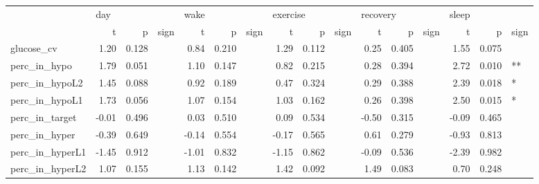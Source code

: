 \begin{tabular}{lrrlrrlrrlrrlrrl}
\toprule
{} & \multicolumn{3}{l}{day} & \multicolumn{3}{l}{wake} & \multicolumn{3}{l}{exercise} & \multicolumn{3}{l}{recovery} & \multicolumn{3}{l}{sleep} \\
{} &     t &      p & sign &     t &      p & sign &        t &      p & sign &        t &      p & sign &     t &      p & sign \\
\midrule
glucose_cv      &  1.20 &  0.128 &      &  0.84 &  0.210 &      &     1.29 &  0.112 &      &     0.25 &  0.405 &      &  1.55 &  0.075 &      \\
perc_in_hypo    &  1.79 &  0.051 &      &  1.10 &  0.147 &      &     0.82 &  0.215 &      &     0.28 &  0.394 &      &  2.72 &  0.010 &   ** \\
perc_in_hypoL2  &  1.45 &  0.088 &      &  0.92 &  0.189 &      &     0.47 &  0.324 &      &     0.29 &  0.388 &      &  2.39 &  0.018 &    * \\
perc_in_hypoL1  &  1.73 &  0.056 &      &  1.07 &  0.154 &      &     1.03 &  0.162 &      &     0.26 &  0.398 &      &  2.50 &  0.015 &    * \\
perc_in_target  & -0.01 &  0.496 &      &  0.03 &  0.510 &      &     0.09 &  0.534 &      &    -0.50 &  0.315 &      & -0.09 &  0.465 &      \\
perc_in_hyper   & -0.39 &  0.649 &      & -0.14 &  0.554 &      &    -0.17 &  0.565 &      &     0.61 &  0.279 &      & -0.93 &  0.813 &      \\
perc_in_hyperL1 & -1.45 &  0.912 &      & -1.01 &  0.832 &      &    -1.15 &  0.862 &      &    -0.09 &  0.536 &      & -2.39 &  0.982 &      \\
perc_in_hyperL2 &  1.07 &  0.155 &      &  1.13 &  0.142 &      &     1.42 &  0.092 &      &     1.49 &  0.083 &      &  0.70 &  0.248 &      \\
\bottomrule
\end{tabular}
